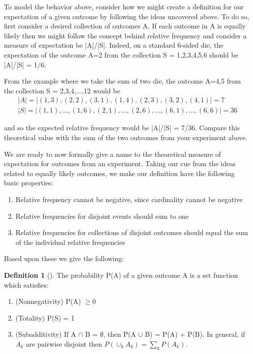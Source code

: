 \documentclass[10pt,]{book}
\theoremstyle{plain}
\theoremstyle{definition}
\newtheorem{definition}[theorem]{Definition}
\theoremstyle{definition}
\theoremstyle{definition}
\numberwithin{equation}{section}
\begin{document}
	To model the behavior above, consider how we might create a definition for our expectation
	of a given outcome by following the ideas uncovered above. To do so, first consider a desired collection
	of outcomes A. If each outcome in A is equally likely then we might follow the concept behind relative 
	frequency and consider a measure of expectation be |A|/|S|. Indeed, on a standard 
	6-sided die, the expectation of the outcome A={2} from the collection S = {1,2,3,4,5,6} should be
	|A|/|S| = 1/6.%
\par
From the example where we take the sum of two die, the outcome A={4,5} from the
	collection S = {2,3,4,...,12} would be%
\begin{gather*}
|A| = | {(1,3),(2,2),(3,1),(1,4),(2,3),(3,2),(4,1)}| = 7\\
|S| = | {(1,1),...,(1,6),(2,1),...,(2,6),...,(6,1),...,(6,6)}| = 36
\end{gather*}\par
and so the expected relative frequency would be |A|/|S| = 7/36. Compare this theoretical value
	with the sum of the two outcomes from your experiment above.%
\par
We are ready to now formally give a name to the theoretical measure of expectation for
	outcomes from an experiment. Taking our cue from the ideas related to equally likely outcomes, we 
	make our definition have the following basic properties:%
\leavevmode%
\begin{enumerate}
\item\hypertarget{li-106}{}Relative frequency cannot be negative, since cardinality cannot be negative%
\item\hypertarget{li-107}{}Relative frequencies for disjoint events should sum to one%
\item\hypertarget{li-108}{}Relative frequencies for collections of disjoint outcomes should equal the sum of the
	individual relative frequencies%
\end{enumerate}
\par
Based upon these we give the following:%
\begin{definition}[{}]\label{DefnProb}
The probability P(A) of a given outcome A is a set function which satisfies:
		\leavevmode%
\begin{enumerate}
\item\hypertarget{li-109}{}(Nonnegativity) P(A) \(\ge 0\)%
\item\hypertarget{li-110}{}(Totality) P(S) = 1%
\item\hypertarget{li-111}{}(Subadditivity) If A \(\cap\) B = \(\emptyset\), then P(A \(\cup\) B) = P(A) + P(B).  
			In general, if {\(A_k\)} are pairwise disjoint then \(P( \cup_k A_k) = \sum_k P(A_k)\).%
\end{enumerate}
\end{definition}
\end{document}
